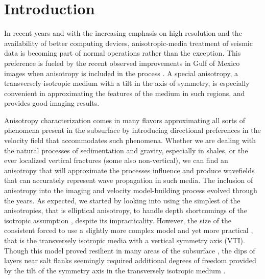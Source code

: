 \section{Introduction}

In recent years and with the increasing emphasis on high resolution and the availability of better computing devices, anisotropic-media treatment of seismic data is becoming part of normal operations rather than the exception. This preference is fueled by the recent observed improvements in Gulf of Mexico images when anisotropy is included in the process \cite[]{zhou:2347,huang:222}. A special anisotropy, a transversely isotropic medium with a tilt in the axis of symmetry, is especially convenient in approximating the features of the medium in such regions, and provides good imaging results.

Anisotropy characterization comes in many flavors approximating all sorts of phenomena present in the subsurface by introducing directional preferences in the velocity field that accommodates such phenomena. Whether we are dealing with the natural processes of sedimentation and gravity, especially in shales, or the ever localized vertical fractures (some also non-vertical), we can find an anisotropy that will approximate the processes influence and produce wavefields that can accurately represent wave propagation in such media.  The inclusion of anisotropy into the imaging and velocity model-building process evolved through the years. As expected, we started by looking into using the simplest of the anisotropies, that is elliptical anisotropy, to handle depth shortcomings of the isotropic assumption \cite[]{GEO60-05-14951513,ohlsen:1600}, despite its impracticality. However, the size of the consistent   forced   to use a slightly more complex model and yet more practical \cite[]{GEO59-09-14051418}, that is the transversely isotropic  media with a vertical symmetry axis (VTI). Though this model proved resilient in many areas of the subsurface \cite[]{GEO62-02-06620675,martinez:149}, the dips of layers near salt flanks seemingly required additional degrees of freedom provided by the tilt of the symmetry axis in the transversely isotropic medium \cite[]{isaac:681}.

